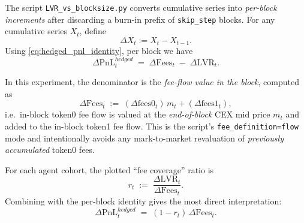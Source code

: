 \documentclass[11pt]{article}
\begin{document}
The script \texttt{LVR\_vs\_blocksize.py} converts cumulative series into \emph{per-block increments} after discarding a
burn-in prefix of \texttt{skip\_step} blocks. For any cumulative series $X_t$, define
\begin{equation}
  \Delta X_t := X_t - X_{t-1}.
\end{equation}
Using \eqref{eq:hedged_pnl_identity}, per block we have
\begin{equation}
  \Delta\mathrm{PnL}^{hedged}_t \;=\; \Delta\mathrm{Fees}_t \;-\; \Delta\mathrm{LVR}_t.
\end{equation}

In this experiment, the denominator is the \emph{fee-flow value in the block}, computed as
\begin{equation}
  \Delta\mathrm{Fees}_t
  \;:=\;
  (\Delta\mathrm{fees0}_t)\,m_t + (\Delta\mathrm{fees1}_t),
\end{equation}
i.e.\ in-block token0 fee flow is valued at the \emph{end-of-block} CEX mid price $m_t$ and added to the in-block token1
fee flow. This is the script's \texttt{fee\_definition=flow} mode and intentionally avoids any mark-to-market revaluation
of \emph{previously accumulated} token0 fees.

For each agent cohort, the plotted ``fee coverage'' ratio is
\begin{equation}
  r_t \;:=\; \frac{\Delta\mathrm{LVR}_t}{\Delta\mathrm{Fees}_t}.
  \label{eq:ratio_def}
\end{equation}
Combining with the per-block identity gives the most direct interpretation:
\begin{equation}
  \Delta\mathrm{PnL}^{hedged}_t \;=\; (1-r_t)\,\Delta\mathrm{Fees}_t.
  \label{eq:ratio_to_hedged_pnl}
\end{equation}
\end{document}
